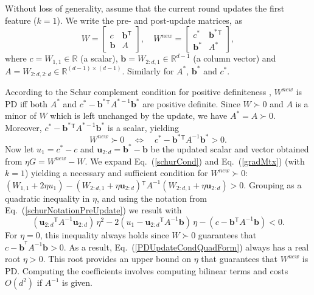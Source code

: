 \documentclass[twoside,11pt]{article}
\newcommand\mat[1]{{#1}}
\renewcommand\vec[1]{\mathbf{#1}}
\newcommand{\T}{{}^\mathsf{T}}
\newcommand{\W}{\mat{W}}
\newcommand{\newW}{{\mat{W^{new}}}}
\newcommand{\R}{\mathbb{R}}
\newcommand{\B}{\vec{b}}
\newcommand{\C}{c}
\newcommand{\invA}{A^{-1}}
\newcommand{\uscalar}{{u}_{1}}
\newcommand{\uvec}{\vec{u}_{2:d}}
\newcommand{\Wvec}{\W_{2:d,1}}
\newcommand{\Wscalar}{\W_{1,1}}
\renewcommand{\eqref}[1]{Eq.~(\ref{#1})}
\begin{document}
Without loss of generality, assume that the current round updates the first feature ($k = 1$). We write the pre- and post-update
matrices, as
\begin{equation}
  \W = \left[ \begin{matrix} \C & \B\T \\ \B & A \end{matrix} \right],
  \quad
  \newW = \left[ \begin{matrix} \C^* & \B^*\T \\ \B^* & A^* \end{matrix} \right],
  \label{schurNotationPreUpdate}
\end{equation}
 where $\C = \Wscalar \in \R$ (a scalar), $\B = \Wvec \in
\R^{d-1}$ (a column vector) and $A = \W_{2:d,2:d} \in \R^{(d-1)
\times (d-1)}$. Similarly for $A^*$, $\B^*$ and $\C^*$.

According to the Schur complement condition for positive definiteness
\citep[p. 650]{boyd2004convex}, $\newW$ is PD iff both
$A^*$ and $\C^* - \B^*\T A^{*-1} \B^*$ are positive definite.
Since $W \succ 0$ and $A$ is a minor of $\W$ which is left unchanged by the update, we have $A^* =
A \succ 0$. Moreover, $\C^* - \B^*\T A^{*-1} \B^*$ is a
scalar, yielding
\begin{equation}
  \newW \succ  0 \quad \Leftrightarrow \quad  \C^* - \B^*\T \invA \B^* >  0.
  \label{schurCond}
\end{equation}
Now let $\uscalar = \C^* - \C$ and $\uvec = \B^* - \B$ be the updated scalar and vector
obtained from $\eta G = \newW - \W$. We expand \eqref{schurCond} and
\eqref{gradMtx} (with $k=1$) yielding a necessary and sufficient condition for $\newW \succ 0$: $(\Wscalar + 2\eta \uscalar)-(\Wvec + \eta \uvec)\T \invA (\Wvec + \eta \uvec)   > 0$.
Grouping as a quadratic inequality in $\eta$, and using the notation from \eqref{schurNotationPreUpdate} we result with
\begin{equation}
\label{PDUpdateCondQuadForm}
(\uvec\T \invA \uvec) \, \eta^2 
-2(\uscalar - \uvec\T \invA \B) \,\eta 
-(\C - \B\T  \invA \B) < 0 .
\end{equation}
For $\eta = 0$, this inequality always
holds since $\W \succ 0$ guarantees that $\C-\B^{\T} \invA \B >0$. As a result,
 \eqref{PDUpdateCondQuadForm} always has a real
root $\eta > 0$. This root provides an upper bound on $\eta$ that guarantees that $\newW$ is PD. Computing the coefficients involves computing bilinear terms and costs $O(d^2)$ if $\invA$ is given.
\end{document}

